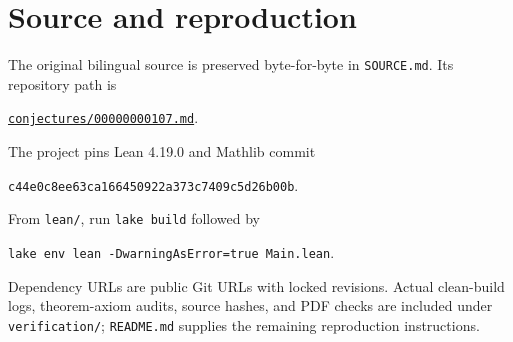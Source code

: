 \documentclass[11pt]{article}
\begin{document}
\section*{Source and reproduction}
The original bilingual source is preserved byte-for-byte in \texttt{SOURCE.md}. Its repository path is
\begin{center}\small\href{https://github.com/The-Last-Math-Competition/The-Last-Math-Competition/blob/main/conjectures/00000000107.md}{\texttt{conjectures/00000000107.md}}.\end{center}
The project pins Lean 4.19.0 and Mathlib commit
\begin{center}\small\texttt{c44e0c8ee63ca166450922a373c7409c5d26b00b}.\end{center}
From \texttt{lean/}, run \texttt{lake build} followed by
\begin{center}\small\texttt{lake env lean -DwarningAsError=true Main.lean}.\end{center}
Dependency URLs are public Git URLs with locked revisions. Actual clean-build logs, theorem-axiom audits, source hashes, and PDF checks are included under \texttt{verification/}; \texttt{README.md} supplies the remaining reproduction instructions.
\end{document}

